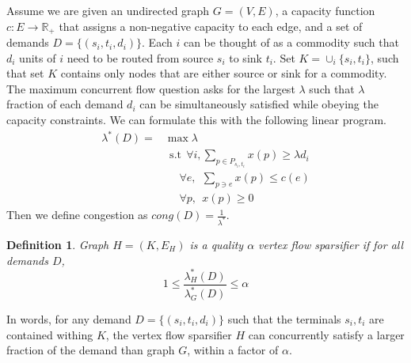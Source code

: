 \documentclass[12pt]{article}
\newtheorem{definition}{Definition}
\begin{document}
		Assume we are given an undirected graph $G = (V,E)$, a capacity function $c: E \rightarrow \mathbb{R}_+$ that assigns a non-negative capacity to each edge, and a set of demands $D = \{(s_i,t_i,d_i)\}$. Each $i$ can be thought of as a commodity such that $d_i$ units of $i$ need to be routed from source $s_i$ to sink $t_i$. Set $K = \cup_i \{s_i, t_i\}$, such that set $K$ contains only nodes that are either source or sink for a commodity. The maximum concurrent flow question asks for the largest $\lambda$ such that $\lambda$ fraction of each demand $d_i$ can be simultaneously satisfied while obeying the capacity constraints. We can formulate this with the following linear program.
		\begin{align*}
		\lambda^*(D) = &\max \lambda \\
		&~~\text{s.t} ~~\forall i, \sum_{p \in P_{s_i,t_i}} x(p) \geq \lambda d_i \\ %
		&~~~~~~\forall e, ~~\sum_{p \ni e} x(p) \leq c(e) \\ %
		&~~~~~~\forall p, ~~x(p) \geq 0 %
		\end{align*}
		Then we define congestion as $cong(D) = \frac{1}{\lambda^*}$.
		\begin{definition}
		Graph $H = (K,E_H)$ is a quality $\alpha$ vertex flow sparsifier if for all demands $D$,
    \[1 \leq \frac{\lambda^*_H(D)}{\lambda^*_G(D)} \leq \alpha\]
		\end{definition}
		In words, for any demand $D = \{(s_i, t_i, d_i)\}$ such that the terminals $s_i, t_i$ are contained withing $K$, the vertex flow sparsifier $H$ can concurrently satisfy a larger fraction of the demand than graph $G$, within a factor of $\alpha$.
		
%		
%
%
%
%    
\end{document}
